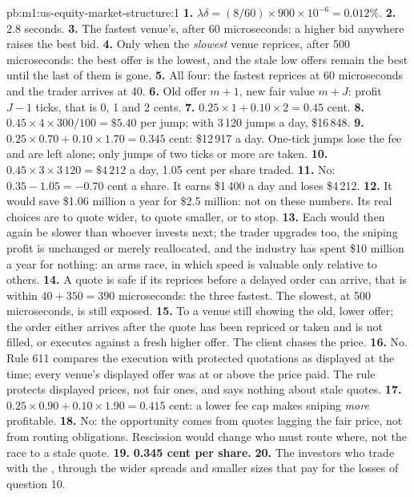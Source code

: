 \begin{solution}{pb:m1:us-equity-market-structure:1}
\textbf{1.} $\lambda\delta = (8/60) \times 900\times10^{-6} = 0.012\%$.
\textbf{2.} 2.8 seconds.
\textbf{3.} The fastest venue's, after 60 microseconds: a higher bid
anywhere raises the best bid.
\textbf{4.} Only when the \emph{slowest} venue reprices, after 500
microseconds: the best offer is the lowest, and the stale low offers remain
the best until the last of them is gone.
\textbf{5.} All four: the fastest reprices at 60 microseconds and the trader
arrives at 40.
\textbf{6.} Old offer $m+1$, new fair value $m+J$: profit $J-1$ ticks, that
is 0, 1 and 2 cents.
\textbf{7.} $0.25 \times 1 + 0.10 \times 2 = 0.45$ cent.
\textbf{8.} $0.45 \times 4 \times 300/100 = \$5.40$ per jump; with 3\,120
jumps a day, \$16\,848.
\textbf{9.} $0.25\times0.70 + 0.10\times1.70 = 0.345$ cent: \$12\,917 a day.
One-tick jumps lose the fee and are left alone; only jumps of two ticks or
more are taken.
\textbf{10.} $0.45 \times 3 \times 3\,120 = \$4\,212$ a day, 1.05 cent per
share traded.
\textbf{11.} No: $0.35 - 1.05 = -0.70$ cent a share. It earns \$1\,400 a day
and loses \$4\,212.
\textbf{12.} It would save \$1.06 million a year for \$2.5 million: not on
these numbers. Its real choices are to quote wider, to quote smaller, or to
stop.
\textbf{13.} Each would then again be slower than whoever invests next; the
trader upgrades too, the sniping profit is unchanged or merely reallocated,
and the industry has spent \$10 million a year for nothing: an arms race, in
which speed is valuable only relative to others.
\textbf{14.} A quote is safe if its  reprices before a delayed
order can arrive, that is within $40 + 350 = 390$ microseconds: the three
fastest. The slowest, at 500 microseconds, is still exposed.
\textbf{15.} To a venue still showing the old, lower offer; the order either
arrives after the quote has been repriced or taken and is not filled, or
executes against a fresh higher offer. The client chases the price.
\textbf{16.} No. Rule 611 compares the execution with protected quotations
as displayed at the time; every venue's displayed offer was at or above the
price paid. The rule protects displayed prices, not fair ones, and says
nothing about stale quotes.
\textbf{17.} $0.25\times0.90 + 0.10\times1.90 = 0.415$ cent: a lower fee cap
makes sniping \emph{more} profitable.
\textbf{18.} No: the opportunity comes from quotes lagging the fair price,
not from routing obligations. Rescission would change who must route where,
not the race to a stale quote.
\textbf{19.} \textbf{0.345 cent per share.}
\textbf{20.} The investors who trade with the , through the
wider spreads and smaller sizes that pay for the losses of question 10.
\end{solution}

